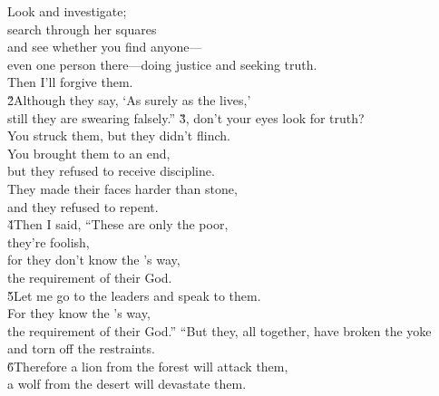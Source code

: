\begin{poetry}
\poeml Look and investigate; \\
\poeml search through her squares \\
\poemll    and see whether you find anyone--- \\
\poeml even one person there---doing justice and seeking truth. \\
\poemll    Then I'll forgive them. \\
\poeml \v{2}Although they say, `As surely as the  lives,' \\
\poemll    still they are swearing falsely.''
\poeml \v{3}, don't your eyes look for truth? \\
\poemll    You struck them, but they didn't flinch. \\
\poeml You brought them to an end, \\
\poemll    but they refused to receive discipline. \\
\poeml They made their faces harder than stone, \\
\poemll    and they refused to repent. \\
\poeml \v{4}Then I said, ``These are only the poor, \\
\poemll    they're foolish, \\
\poeml for they don't know the 's way, \\
\poemll    the requirement of their God. \\
\poeml \v{5}Let me go to the leaders and speak to them. \\
\poemll    For they know the 's way, \\
\poemlll       the requirement of their God.''
\poeml ``But they, all together, have broken the yoke \\
\poemll    and torn off the restraints. \\
\poeml \v{6}Therefore a lion from the forest will attack them, \\
\poemll    a wolf from the desert will devastate them. \\

\end{poetry}
